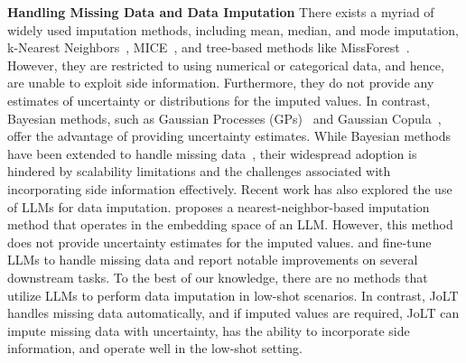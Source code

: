 \textbf{Handling Missing Data and Data Imputation}
%
There exists a myriad of widely used imputation methods, including mean, median, and mode imputation, k-Nearest Neighbors~\citep{Troyanskaya2001MissingVE}, MICE~\citep{little2002statistical}, and tree-based methods like MissForest~\citep{Stekhoven2011MissForestN}.
%
However, they are restricted to using numerical or categorical data, and hence, are unable to exploit side information. Furthermore, they do not provide any estimates of uncertainty or distributions for the imputed values. 
%
In contrast, Bayesian methods, such as Gaussian Processes (GPs)~\citep{Rasmussen2006Gaussian} and Gaussian Copula~\citep{NelsenRogerB1999Aitc}, offer the advantage of providing uncertainty estimates. 
%
While Bayesian methods have been extended to handle missing data~\citep{zhaocopula2022,bahram2023gp}, their widespread adoption is hindered by scalability limitations and the challenges associated with incorporating side information effectively.
%
Recent work has also explored the use of LLMs for data imputation.
%
\citet{anonymous2024contextdriven} proposes a nearest-neighbor-based imputation method that operates in the embedding space of an LLM.
%
However, this method does not provide uncertainty estimates for the imputed values. 
%
\citet{Ding2024DataIU} and \citet{hayat2024claimdataenhancingimputation} fine-tune LLMs to handle missing data and report notable improvements on several downstream tasks. 
% 
To the best of our knowledge, there are no methods that utilize LLMs to perform data imputation in low-shot scenarios.
%
In contrast, JoLT handles missing data automatically, and if imputed values are required, JoLT can impute missing data with uncertainty, has the ability to incorporate side information, and operate well in the low-shot setting.
%